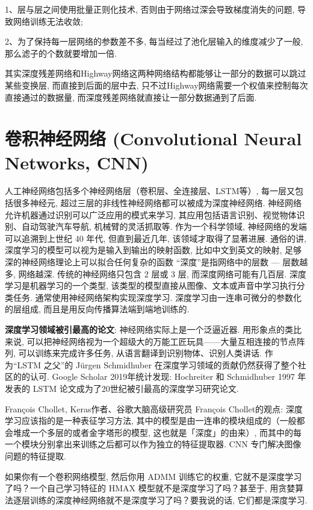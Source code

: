 1、层与层之间使用批量正则化技术, 否则由于网络过深会导致梯度消失的问题, 导致网络训练无法收敛;

2、为了保持每一层网络的参数差不多, 每当经过了池化层输入的维度减少了一般, 那么滤子的个数就要增加一倍.

其实深度残差网络和Highway网络这两种网络结构都能够让一部分的数据可以跳过某些变换层, 而直接到后面的层中去, 只不过Highway网络需要一个权值来控制每次直接通过的数据量, 而深度残差网络就直接让一部分数据通到了后面.
\section{卷积神经网络 (Convolutional Neural Networks, CNN)}
人工神经网络包括多个神经网络层（卷积层、全连接层、LSTM等）, 每一层又包括很多神经元, 超过三层的非线性神经网络都可以被成为深度神经网络.
神经网络允许机器通过识别可以广泛应用的模式来学习, 其应用包括语言识别、视觉物体识别、自动驾驶汽车导航, 机械臂的灵活抓取等. 作为一个科学领域, 神经网络的发端可以追溯到上世纪 40 年代, 但直到最近几年, 该领域才取得了显著进展.
通俗的讲, 深度学习的模型可以视为是输入到输出的映射函数, 比如中文到英文的映射, 足够深的神经网络理论上可以拟合任何复杂的函数
“深度”是指网络中的层数 — 层数越多, 网络越深. 传统的神经网络只包含 2 层或 3 层, 而深度网络可能有几百层.
深度学习是机器学习的一个类型, 该类型的模型直接从图像、文本或声音中学习执行分类任务. 通常使用神经网络架构实现深度学习.
深度学习由一连串可微分的参数化的层组成, 而且是用反向传播算法端到端地训练的.
\begin{remark}
\textbf{深度学习领域被引最高的论文}:
神经网络实际上是一个泛逼近器. 用形象点的类比来说, 可以把神经网络视为一个超级大的万能工匠玩具——大量互相连接的节点阵列, 可以训练来完成许多任务, 从语言翻译到识别物体、识别人类讲话.
作为“LSTM 之父”的 Jürgen Schmidhuber 在深度学习领域的贡献仍然获得了整个社区的的认可.
Google Scholar 2019年统计发现:  Hochreiter 和 Schmidhuber 1997 年发表的 LSTM 论文成为了20世纪被引最高的深度学习研究论文\cite{HochreiterNC1997}.
\end{remark}

François Chollet, Keras作者、谷歌大脑高级研究员 François Chollet的观点: 深度学习应该指的是一种表征学习方法, 其中的模型是由一连串的模块组成的（一般都会堆成一个多层的或者金字塔形的模型, 这也就是「深度」的由来）, 而其中的每一个模块分别拿出来训练之后都可以作为独立的特征提取器. CNN 专门解决图像问题的特征提取.
\begin{example}
  如果你有一个卷积网络模型, 然后你用 ADMM 训练它的权重, 它就不是深度学习了吗？一个自己学习特征的 HMAX 模型就不是深度学习了吗？甚至于, 用贪婪算法逐层训练的深度神经网络就不是深度学习了吗？要我说的话, 它们都是深度学习.
\end{example}

